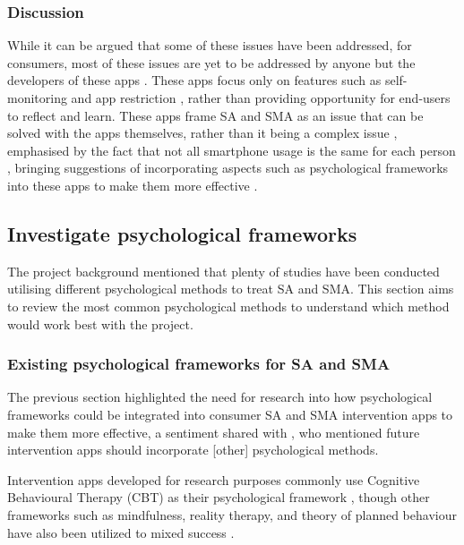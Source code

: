 \documentclass[12pt]{article}
\begin{document}
\subsubsection{Discussion}
While it can be argued that some of these issues have been addressed, for consumers, most of
these issues are yet to be addressed by anyone but the developers of these apps 
\autocite{RefWorks:RefID:35-dosselaar2017smartphone}. These apps focus only on features
such as self-monitoring and app restriction \autocite{RefWorks:RefID:74-löchtefeld2013appdetox}, rather than 
providing opportunity for end-users to reflect and learn. These apps frame SA and SMA as an issue 
that can be solved with the apps themselves, rather than it being a complex issue
\autocite{RefWorks:RefID:128-santhosh2025augmented}, emphasised by the fact that not all smartphone usage 
is the same for each person \autocite{RefWorks:RefID:126-petrucco2021user}, bringing suggestions of
incorporating aspects such as psychological frameworks into these apps to make them more effective 
\autocite{RefWorks:RefID:35-dosselaar2017smartphone}.


\subsection{Investigate psychological frameworks}
The project background mentioned that plenty of studies have been conducted utilising different
psychological methods to treat SA and SMA. This section aims to review the most common psychological methods
to understand which method would work best with the project.

\subsubsection{Existing psychological frameworks for SA and SMA}
The previous section highlighted the need for research into how psychological frameworks could be integrated into 
consumer SA and SMA intervention apps to make them more effective, a sentiment shared with 
\textcite{RefWorks:RefID:75-oliveira2021effectiveness}, who mentioned future intervention apps should 
incorporate [other] psychological methods. \newline

Intervention apps developed for research purposes commonly use Cognitive Behavioural Therapy (CBT) as their 
psychological framework
\autocite{RefWorks:RefID:87-weisel2019standalone,RefWorks:RefID:75-oliveira2021effectiveness}, though other 
frameworks such as mindfulness, reality therapy, and theory of planned behaviour have also been utilized to 
mixed success 
\autocite{RefWorks:RefID:135-gajecki2014mobile, RefWorks:RefID:136-witkiewitz2014development, RefWorks:RefID:106-lu2025interventions}.
\end{document}
